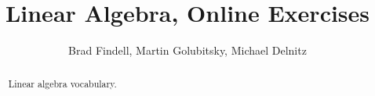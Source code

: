 \documentclass[numbers,nooutcomes,twoside,hints]{xourse}
\title{Linear Algebra, Online Exercises}
\author{Brad Findell, Martin Golubitsky, Michael Delnitz}
\begin{document}
\begin{abstract}
Linear algebra vocabulary.  
\end{abstract}
\maketitle


\end{document}
